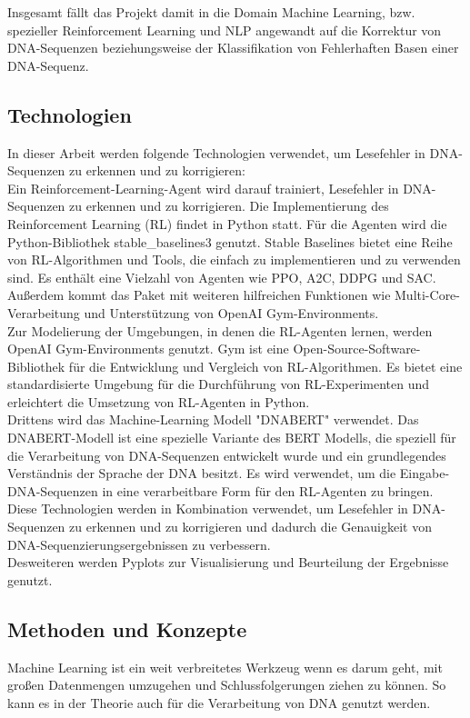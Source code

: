 \documentclass[oneside,bibliography=totocnumbered,BCOR=5mm]{scrbook}%
\theoremstyle{definition}
\theoremstyle{definition}
\theoremstyle{definition}
\theoremstyle{definition}
\theoremstyle{definition}
\theoremstyle{definition}
\begin{document}
Insgesamt fällt das Projekt damit in die Domain Machine Learning, bzw. spezieller Reinforcement Learning und NLP angewandt 
auf die Korrektur von DNA-Sequenzen beziehungsweise der Klassifikation von Fehlerhaften Basen einer DNA-Sequenz.


\subsection{Technologien}
In dieser Arbeit werden folgende Technologien verwendet, 
um Lesefehler in DNA-Sequenzen zu erkennen und zu korrigieren:\\


Ein Reinforcement-Learning-Agent wird darauf trainiert, Lesefehler in DNA-Sequenzen zu erkennen und zu korrigieren. 
Die Implementierung des Reinforcement Learning (RL) findet in Python statt. 
Für die Agenten wird die Python-Bibliothek stable\_baselines3 genutzt. 
Stable Baselines bietet eine Reihe von RL-Algorithmen und Tools, die einfach zu implementieren und zu verwenden sind. 
Es enthält eine Vielzahl von Agenten wie PPO, A2C, DDPG und SAC. 
Außerdem kommt das Paket mit weiteren hilfreichen Funktionen wie Multi-Core-Verarbeitung und
Unterstützung von OpenAI Gym-Environments. \\

Zur Modelierung der Umgebungen, in denen die RL-Agenten lernen, werden OpenAI Gym-Environments genutzt. 
Gym ist eine Open-Source-Software-Bibliothek für die Entwicklung und Vergleich von RL-Algorithmen. 
Es bietet eine standardisierte Umgebung für die Durchführung von RL-Experimenten und 
erleichtert die Umsetzung von RL-Agenten in Python. \\


Drittens wird das Machine-Learning Modell "DNABERT" verwendet.
Das DNABERT-Modell ist eine spezielle Variante des BERT Modells, 
die speziell für die Verarbeitung von DNA-Sequenzen entwickelt wurde und 
ein grundlegendes Verständnis der Sprache der DNA besitzt. 
Es wird verwendet, um die Eingabe-DNA-Sequenzen in eine verarbeitbare Form für den RL-Agenten zu bringen.
Diese Technologien werden in Kombination verwendet, um Lesefehler in DNA-Sequenzen zu erkennen und zu korrigieren 
und dadurch die Genauigkeit von DNA-Sequenzierungsergebnissen zu verbessern. \\

Desweiteren werden Pyplots zur Visualisierung und Beurteilung der Ergebnisse genutzt.


\subsection{Methoden und Konzepte}
Machine Learning ist ein weit verbreitetes Werkzeug wenn es darum geht, 
mit großen Datenmengen umzugehen und Schlussfolgerungen ziehen zu können. 
So kann es in der Theorie auch für die Verarbeitung von DNA genutzt werden. \\
\end{document}
